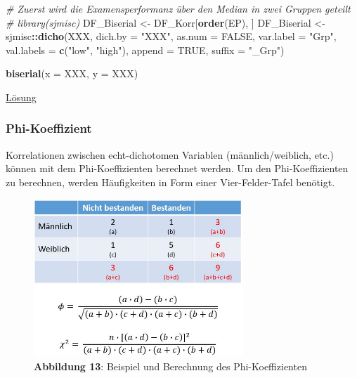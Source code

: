 \documentclass[
]{article}
\newenvironment{Shaded}{\begin{snugshade}}{\end{snugshade}}
\newcommand{\AttributeTok}[1]{\textcolor[rgb]{0.13,0.29,0.53}{#1}}
\newcommand{\CommentTok}[1]{\textcolor[rgb]{0.56,0.35,0.01}{\textit{#1}}}
\newcommand{\ConstantTok}[1]{\textcolor[rgb]{0.56,0.35,0.01}{#1}}
\newcommand{\FunctionTok}[1]{\textcolor[rgb]{0.13,0.29,0.53}{\textbf{#1}}}
\newcommand{\NormalTok}[1]{#1}
\newcommand{\OtherTok}[1]{\textcolor[rgb]{0.56,0.35,0.01}{#1}}
\newcommand{\SpecialCharTok}[1]{\textcolor[rgb]{0.81,0.36,0.00}{\textbf{#1}}}
\newcommand{\StringTok}[1]{\textcolor[rgb]{0.31,0.60,0.02}{#1}}
\begin{document}
\begin{Shaded}
\begin{Highlighting}[]
      \CommentTok{\# Zuerst wird die Examensperformanz über den Median in zwei Gruppen geteilt}
      \CommentTok{\# library(sjmisc)}
\NormalTok{      DF\_Biserial }\OtherTok{\textless{}{-}}\NormalTok{ DF\_Korr[}\FunctionTok{order}\NormalTok{(EP), ]}
\NormalTok{      DF\_Biserial }\OtherTok{\textless{}{-}}\NormalTok{ sjmisc}\SpecialCharTok{::}\FunctionTok{dicho}\NormalTok{(XXX,}
                                   \AttributeTok{dich.by =} \StringTok{"XXX"}\NormalTok{, }
                                   \AttributeTok{as.num =} \ConstantTok{FALSE}\NormalTok{, }
                                   \AttributeTok{var.label =} \StringTok{"Grp"}\NormalTok{,}
                                   \AttributeTok{val.labels =} \FunctionTok{c}\NormalTok{(}\StringTok{"low"}\NormalTok{, }\StringTok{"high"}\NormalTok{), }
                                   \AttributeTok{append =} \ConstantTok{TRUE}\NormalTok{, }
                                   \AttributeTok{suffix =} \StringTok{"\_Grp"}\NormalTok{)}

      \FunctionTok{biserial}\NormalTok{(}\AttributeTok{x =}\NormalTok{ XXX, }\AttributeTok{y =}\NormalTok{ XXX)}
\end{Highlighting}
\end{Shaded}

\hyperref[aufgabe-biserial-lsg]{Lösung}

\subsubsection*{Phi-Koeffizient}\label{phi-koeffizient}

Korrelationen zwischen echt-dichotomen Variablen (männlich/weiblich, etc.) können mit dem Phi-Koeffizienten berechnet werden. Um den Phi-Koeffizienten zu berechnen, werden Häufigkeiten in Form einer Vier-Felder-Tafel benötigt.

\begin{figure}
\centering
\includegraphics[width=0.7\textwidth,height=\textheight]{Images/PHIKoeffizient.JPG}
\caption{\textbf{Abbildung 13}: Beispiel und Berechnung des Phi-Koeffizienten}
\end{figure}
\end{document}

